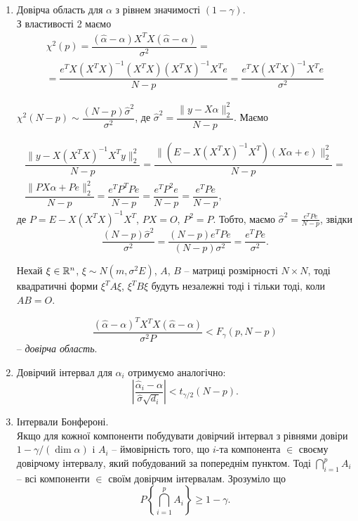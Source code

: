 \begin{enumerate}
	\item Довірча область для $\alpha$ з рівнем значимості $(1-\gamma)$. \\

	З властивості 2 маємо 
	\begin{multline*}
		\chi^2(p) = \dfrac{(\widehat{\alpha}-\alpha)X^TX(\widehat{\alpha}-\alpha)}{\sigma^2} = \\
		= \dfrac{e^TX(X^TX)^{-1}(X^TX)(X^TX)^{-1}X^Te}{N-p} = \dfrac{e^TX(X^TX)^{-1}X^Te}{\sigma^2}
	\end{multline*}

	$\chi^2(N - p)\sim \dfrac{(N-p)\widehat{\sigma}^2}{\sigma^2}$, де $\widehat{\sigma}^2 = \dfrac{\|y-X\alpha\|_2^2}{N-p}$. Маємо

	\begin{multline*} 
		\dfrac{\|y-X(X^TX)^{-1}X^Ty\|_2^2}{N-p} = \dfrac{\|(E-X(X^TX)^{-1}X^T)(X\alpha+e)\|_2^2}{N-p} = \\
		\dfrac{\|PX\alpha+Pe\|_2^2}{N-p} = \dfrac{e^TP^TPe}{N-p} = \dfrac{e^TP^2e}{N-p} = \dfrac{e^TPe}{N-p},
	\end{multline*}
	де $P = E-X(X^TX)^{-1}X^T$, $PX=O$, $P^2=P$. Тобто, маємо $\widehat{\sigma}^2 = \frac{e^TPe}{N-p}$, звідки \[\dfrac{(N-p)\widehat{\sigma}^2}{\sigma^2}=\dfrac{(N-p)e^TPe}{(N-p)\sigma^2} = \dfrac{e^TPe}{\sigma^2}. \]

	\begin{lemma}	
		Нехай $\xi\in\mathbb{R}^n$, $\xi\sim N(m,\sigma^2E)$, $A$, $B$ -- матриці розмірності $N\times N$, тоді квадратичні форми $\xi^TA\xi$, $\xi^TB\xi$ будуть незалежні тоді і тільки тоді, коли $AB = O$.
	\end{lemma}

	\[ \dfrac{(\widehat{\alpha}-\alpha)^TX^TX(\widehat{\alpha}-\alpha)}{\sigma^2P} < F_\gamma(p, N-p)\] -- \textit{довірча область}.

	\item Довірчий інтервал для $\alpha_i$ отримуємо аналогічно:
	\[ \left|\dfrac{\widehat{\alpha}_i-\alpha}{\widehat{\sigma}\sqrt{d_i}}\right|<t_{\gamma/2}(N-p). \]

	\item Інтервали Бонфероні. \\

	Якщо для кожної компоненти побудувати довірчий інтервал з рівнями довіри $1 - \gamma/(\dim \alpha)$ i $A_i$ -- ймовірність того, що $i$-та компонента $\in$ своєму довірчому інтервалу, який побудований за попереднім пунктом. Тоді $\bigcap\limits_{i=1}^p A_i$ -- всі компоненти $\in$ своїм довірчим інтервалам. Зрозуміло що \[P\left\{\bigcap\limits_{i=1}^p A_i\right\}\ge1-\gamma.\]
\end{enumerate}

